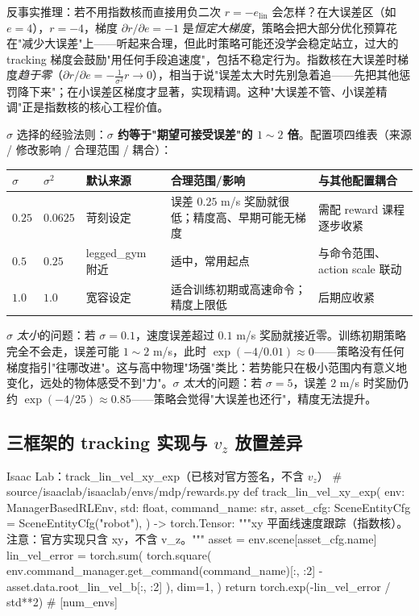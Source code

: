 \begin{insight}\label{ins:rlmc-rew-expgrad}
反事实推理：若不用指数核而直接用负二次 $r=-e_{\text{lin}}$ 会怎样？在大误差区（如 $e=4$），$r=-4$，梯度 $\partial r/\partial e=-1$ 是\emph{恒定大梯度}，策略会把大部分优化预算花在"减少大误差"上——听起来合理，但此时策略可能还没学会稳定站立，过大的 tracking 梯度会鼓励"用任何手段追速度"，包括不稳定行为。指数核在大误差时梯度\emph{趋于零}（$\partial r/\partial e=-\tfrac{1}{\sigma^2}r\to0$），相当于说"误差太大时先别急着追——先把其他惩罚降下来"；在小误差区梯度才显著，实现精调。这种"大误差不管、小误差精调"正是指数核的核心工程价值。
\end{insight}

$\sigma$ 选择的经验法则：\textbf{$\sigma$ 约等于"期望可接受误差"的 $1\!\sim\!2$ 倍}。配置项四维表（来源 / 修改影响 / 合理范围 / 耦合）：

\begin{center}
\small
\begin{tabular}{@{}lllll@{}}
\toprule
$\sigma$ & $\sigma^2$ & 默认来源 & 合理范围/影响 & 与其他配置耦合 \\
\midrule
$0.25$ & $0.0625$ & 苛刻设定 & 误差 $0.25$ m/s 奖励就很低；精度高、早期可能无梯度 & 需配 reward 课程逐步收紧 \\
$0.5$ & $0.25$ & legged\_gym 附近\,\cite{rudin2021minutes} & 适中，常用起点 & 与命令范围、action scale 联动 \\
$1.0$ & $1.0$ & 宽容设定 & 适合训练初期或高速命令；精度上限低 & 后期应收紧 \\
\bottomrule
\end{tabular}
\end{center}

$\sigma$ \emph{太小}的问题：若 $\sigma=0.1$，速度误差超过 $0.1$ m/s 奖励就接近零。训练初期策略完全不会走，误差可能 $1\!\sim\!2$ m/s，此时 $\exp(-4/0.01)\approx0$——策略没有任何梯度指引"往哪改进"。这与高中物理"场强"类比：若势能只在极小范围内有意义地变化，远处的物体感受不到"力"。$\sigma$ \emph{太大}的问题：若 $\sigma=5$，误差 $2$ m/s 时奖励仍约 $\exp(-4/25)\approx0.85$——策略会觉得"大误差也还行"，精度无法提升。

\subsection{\texorpdfstring{三框架的 tracking 实现与 $v_z$ 放置差异}{三框架的 tracking 实现与 vz 放置差异}}
\label{sec:rlmc-rew-trackimpl}

\begin{codebox}[Python]{Isaac Lab：track\_lin\_vel\_xy\_exp（已核对官方签名，不含 $v_z$）}
# source/isaaclab/isaaclab/envs/mdp/rewards.py
def track_lin_vel_xy_exp(
    env: ManagerBasedRLEnv, std: float, command_name: str,
    asset_cfg: SceneEntityCfg = SceneEntityCfg("robot"),
) -> torch.Tensor:
    """xy 平面线速度跟踪（指数核）。注意：官方实现只含 xy，不含 v_z。"""
    asset = env.scene[asset_cfg.name]
    lin_vel_error = torch.sum(
        torch.square(
            env.command_manager.get_command(command_name)[:, :2]
            - asset.data.root_lin_vel_b[:, :2]
        ), dim=1,
    )
    return torch.exp(-lin_vel_error / std**2)            # [num_envs]
\end{codebox}

